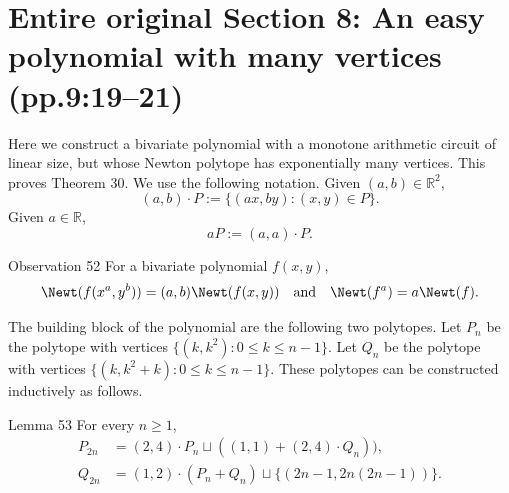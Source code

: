 \section*{Entire original Section 8: An easy polynomial with many vertices (pp.9:19--21)}
Here we construct a bivariate polynomial with a monotone arithmetic circuit of linear size, but whose Newton polytope has exponentially many vertices. This proves Theorem 30.
We use the following notation. Given $(a,b)\in\mathbb R^2$,
\[(a,b)\cdot P:=\{(ax,by):(x,y)\in P\}.\]
Given $a\in\mathbb R$,
\[aP:=(a,a)\cdot P.\]
\begin{sourceresult}{Observation 52}
For a bivariate polynomial $f(x,y)$,
\[\Newt(f(x^a,y^b))=(a,b)\Newt(f(x,y))\quad\text{and}\quad\Newt(f^a)=a\Newt(f).\]
\end{sourceresult}
The building block of the polynomial are the following two polytopes. Let $P_n$ be the polytope with vertices $\{(k,k^2):0\le k\le n-1\}$. Let $Q_n$ be the polytope with vertices $\{(k,k^2+k):0\le k\le n-1\}$. These polytopes can be constructed inductively as follows.
\begin{sourceresult}{Lemma 53}
For every $n\ge1$,
\begin{align}
P_{2n}&=(2,4)\cdot P_n\sqcup((1,1)+(2,4)\cdot Q_n)),\tag{8}\\
Q_{2n}&=(1,2)\cdot(P_n+Q_n)\sqcup\{(2n-1,2n(2n-1))\}.\tag{9}
\end{align}
\end{sourceresult}
